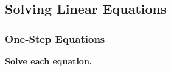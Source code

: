 \documentclass[11pt]{book}
\newcommand{\tmstrong}[1]{\textbf{#1}}
\theoremstyle{definition}  %
\begin{document}
\subsection{Solving Linear Equations}\par

\subsubsection{One-Step Equations}\par


{\tmstrong{Solve each equation.}}
\end{document}
